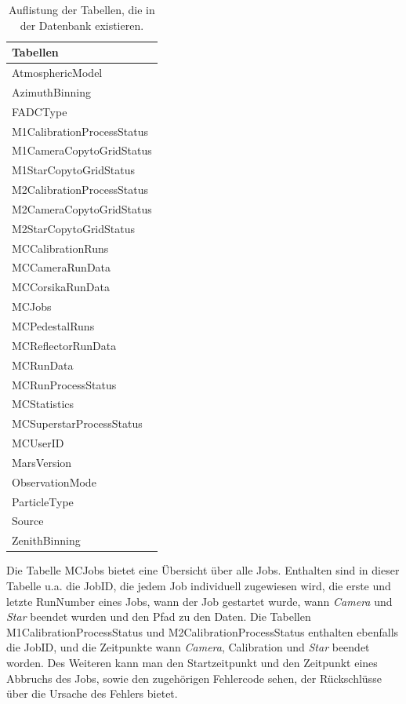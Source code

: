 \begin{table}[!h]
\centering
\caption{Auflistung der Tabellen, die in der Datenbank existieren.}
\label{MYSQL_Tabellen}
\begin{tabular}{l}
  \toprule
  Tabellen\\
  \midrule
  AtmosphericModel           \\
  AzimuthBinning             \\
  FADCType                   \\
  M1CalibrationProcessStatus \\
  M1CameraCopytoGridStatus   \\
  M1StarCopytoGridStatus     \\
  M2CalibrationProcessStatus \\
  M2CameraCopytoGridStatus   \\
  M2StarCopytoGridStatus     \\
  MCCalibrationRuns          \\
  MCCameraRunData            \\
  MCCorsikaRunData           \\
  MCJobs                     \\
  MCPedestalRuns             \\
  MCReflectorRunData         \\
  MCRunData                  \\
  MCRunProcessStatus         \\
  MCStatistics               \\
  MCSuperstarProcessStatus   \\
  MCUserID                   \\
  MarsVersion                \\
  ObservationMode            \\
  ParticleType               \\
  Source                     \\
  ZenithBinning   	     \\
  \bottomrule
\end{tabular}
\end{table}


Die Tabelle MCJobs bietet eine Übersicht über alle Jobs. 
Enthalten sind in dieser Tabelle u.a. die JobID, die jedem Job individuell zugewiesen wird, die erste und letzte RunNumber eines Jobs, wann der Job gestartet wurde, wann \textit{Camera} und \textit{Star} beendet wurden und den Pfad zu den Daten.\newline
Die Tabellen M1CalibrationProcessStatus und M2CalibrationProcessStatus enthalten ebenfalls die JobID, und die Zeitpunkte wann \textit{Camera}, Calibration und \textit{Star} beendet worden. 
Des Weiteren kann man den Startzeitpunkt und den Zeitpunkt eines Abbruchs des Jobs, sowie den zugehörigen Fehlercode sehen, der Rückschlüsse über die Ursache des Fehlers bietet.

